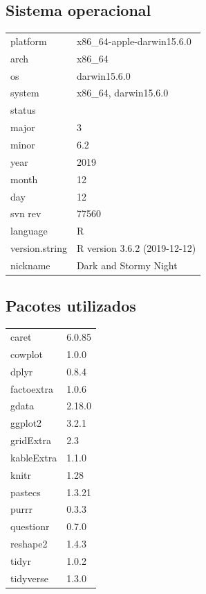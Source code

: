 \documentclass[]{article}
\begin{document}
\hypertarget{sistema-operacional}{%
\subsection{Sistema operacional}\label{sistema-operacional}}

\begin{table}[H]
\centering
\begin{tabular}{ll}
\toprule
platform & x86\_64-apple-darwin15.6.0\\
arch & x86\_64\\
os & darwin15.6.0\\
system & x86\_64, darwin15.6.0\\
status & \\
\addlinespace
major & 3\\
minor & 6.2\\
year & 2019\\
month & 12\\
day & 12\\
\addlinespace
svn rev & 77560\\
language & R\\
version.string & R version 3.6.2 (2019-12-12)\\
nickname & Dark and Stormy Night\\
\bottomrule
\end{tabular}
\end{table}

\hypertarget{pacotes-utilizados}{%
\subsection{Pacotes utilizados}\label{pacotes-utilizados}}

\begin{table}[H]
\centering
\begin{tabular}{ll}
\toprule
caret & 6.0.85\\
cowplot & 1.0.0\\
dplyr & 0.8.4\\
factoextra & 1.0.6\\
gdata & 2.18.0\\
\addlinespace
ggplot2 & 3.2.1\\
gridExtra & 2.3\\
kableExtra & 1.1.0\\
knitr & 1.28\\
pastecs & 1.3.21\\
\addlinespace
purrr & 0.3.3\\
questionr & 0.7.0\\
reshape2 & 1.4.3\\
tidyr & 1.0.2\\
tidyverse & 1.3.0\\
\bottomrule
\end{tabular}
\end{table}
\newpage
\end{document}
